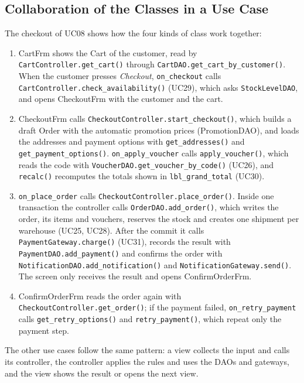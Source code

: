 \subsection{Collaboration of the Classes in a Use Case}
\label{subsec:states}
The checkout of UC08 shows how the four kinds of class work together:
\begin{enumerate}
  \item \textsf{CartFrm} shows the \textsf{Cart} of the customer, read by \texttt{CartController.get\_cart()} through \texttt{CartDAO.get\_cart\_by\_customer()}. When the customer presses \emph{Checkout}, \texttt{on\_checkout} calls \texttt{CartController.check\_availability()} (UC29), which asks \texttt{StockLevelDAO}, and opens \textsf{CheckoutFrm} with the customer and the cart.
  \item \textsf{CheckoutFrm} calls \texttt{CheckoutController.start\_checkout()}, which builds a draft \textsf{Order} with the automatic promotion prices (\textsf{PromotionDAO}), and loads the addresses and payment options with \texttt{get\_addresses()} and \texttt{get\_payment\_options()}. \texttt{on\_apply\_voucher} calls \texttt{apply\_voucher()}, which reads the code with \texttt{VoucherDAO.get\_voucher\_by\_code()} (UC26), and \texttt{recalc()} recomputes the totals shown in \texttt{lbl\_grand\_total} (UC30).
  \item \texttt{on\_place\_order} calls \texttt{CheckoutController.place\_order()}. Inside one transaction the controller calls \texttt{OrderDAO.add\_order()}, which writes the order, its items and vouchers, reserves the stock and creates one shipment per warehouse (UC25, UC28). After the commit it calls \texttt{PaymentGateway.charge()} (UC31), records the result with \texttt{PaymentDAO.add\_payment()} and confirms the order with \texttt{NotificationDAO.add\_notification()} and \texttt{NotificationGateway.send()}. The screen only receives the result and opens \textsf{ConfirmOrderFrm}.
  \item \textsf{ConfirmOrderFrm} reads the order again with \texttt{CheckoutController.get\_order()}; if the payment failed, \texttt{on\_retry\_payment} calls \texttt{get\_retry\_options()} and \texttt{retry\_payment()}, which repeat only the payment step.
\end{enumerate}
The other use cases follow the same pattern: a view collects the input and calls its controller, the controller applies the rules and uses the DAOs and gateways, and the view shows the result or opens the next view.


